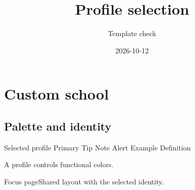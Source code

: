 \documentclass{beamer}
\title{Profile selection}
\author{Template check}
\date{2026-10-12}
\begin{document}
\maketitle
\section{Custom school}
\subsection{Palette and identity}
\begin{frame}{Selected profile}
  \textcolor{maincolor}{Primary}
  \textcolor{tipcolor}{Tip}
  \textcolor{notecolor}{Note}
  \textcolor{alertcolor}{Alert}
  \textcolor{examplecolor}{Example}
  \textcolor{definitioncolor}{Definition}
  \begin{tipbox}A profile controls functional colors.\end{tipbox}
  \fitgraphic[width=.3,height=.1]{\schoolwordmarkonlight}
\end{frame}
\begin{frame}[campusfocus]{Focus page}Shared layout with the selected identity.\end{frame}
\backmatter
\end{document}
